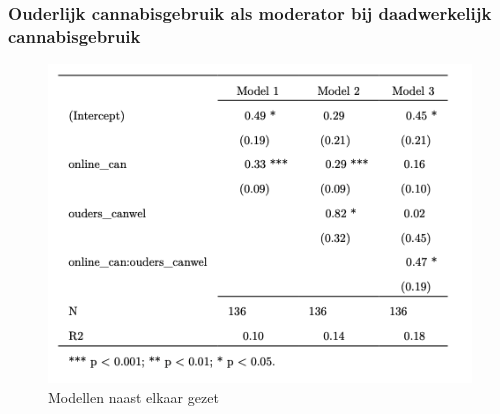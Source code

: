 \documentclass[
  letterpaper,
  DIV=11,
  numbers=noendperiod]{scrartcl}
\begin{document}
\hypertarget{ouderlijk-cannabisgebruik-als-moderator-bij-daadwerkelijk-cannabisgebruik}{%
\subsubsection{Ouderlijk cannabisgebruik als moderator bij daadwerkelijk
cannabisgebruik}\label{ouderlijk-cannabisgebruik-als-moderator-bij-daadwerkelijk-cannabisgebruik}}

\begin{figure}

{\centering \includegraphics{images/Screenshot3.png}

}

\caption{Modellen naast elkaar gezet}

\end{figure}
\end{document}
